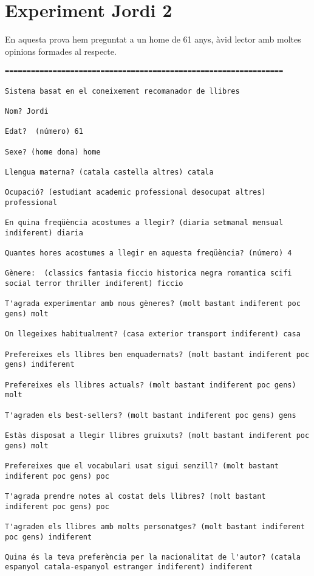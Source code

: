 
\section{Experiment Jordi 2}

En aquesta prova hem preguntat a un home de 61 anys, àvid lector amb moltes opinions formades al respecte.

\begin{verbatim}
================================================================

Sistema basat en el coneixement recomanador de llibres

Nom? Jordi

Edat?  (número) 61

Sexe? (home dona) home

Llengua materna? (catala castella altres) catala

Ocupació? (estudiant academic professional desocupat altres) professional

En quina freqüència acostumes a llegir? (diaria setmanal mensual indiferent) diaria

Quantes hores acostumes a llegir en aquesta freqüència? (número) 4

Gènere:  (classics fantasia ficcio historica negra romantica scifi social terror thriller indiferent) ficcio

T'agrada experimentar amb nous gèneres? (molt bastant indiferent poc gens) molt

On llegeixes habitualment? (casa exterior transport indiferent) casa

Prefereixes els llibres ben enquadernats? (molt bastant indiferent poc gens) indiferent

Prefereixes els llibres actuals? (molt bastant indiferent poc gens) molt

T'agraden els best-sellers? (molt bastant indiferent poc gens) gens

Estàs disposat a llegir llibres gruixuts? (molt bastant indiferent poc gens) molt

Prefereixes que el vocabulari usat sigui senzill? (molt bastant indiferent poc gens) poc

T'agrada prendre notes al costat dels llibres? (molt bastant indiferent poc gens) poc

T'agraden els llibres amb molts personatges? (molt bastant indiferent poc gens) indiferent

Quina és la teva preferència per la nacionalitat de l'autor? (catala espanyol catala-espanyol estranger indiferent) indiferent


\end{verbatim}
